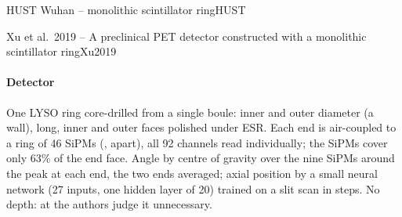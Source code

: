 \begin{programnote}{HUST Wuhan -- monolithic scintillator ring}{HUST}
\begin{papernote}{Xu et al.\ 2019 -- A preclinical PET detector constructed with a monolithic scintillator ring}{Xu2019}
\paragraph{Detector}
One LYSO ring core-drilled from a single boule:  inner and 
outer diameter (a  wall),  long, inner and outer faces polished
under ESR. Each end is air-coupled to a ring of 46 SiPMs
(,  apart), all 92 channels read
individually; the SiPMs cover only 63\% of the  end face. Angle by centre
of gravity over the nine SiPMs around the peak at each end, the two ends
averaged; axial position by a small neural network (27 inputs, one hidden
layer of 20) trained on a slit scan in  steps. No depth: at  the
authors judge it unnecessary.


\end{papernote}
\end{programnote}
